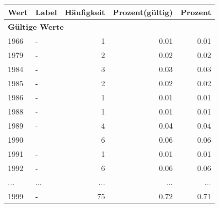      \begin{longtable}{lXrrr}
     \toprule
     \textbf{Wert} & \textbf{Label} & \textbf{Häufigkeit} & \textbf{Prozent(gültig)} & \textbf{Prozent} \\
     \endhead
     \midrule
     \multicolumn{5}{l}{\textbf{Gültige Werte}}\\
        1966 & \multicolumn{1}{X}{-} & %
          \num{1} &
          \num[round-mode=places,round-precision=2]{0,01} &
          \num[round-mode=places,round-precision=2]{0,01} \\
        1979 & \multicolumn{1}{X}{-} & %
          \num{2} &
          \num[round-mode=places,round-precision=2]{0,02} &
          \num[round-mode=places,round-precision=2]{0,02} \\
        1984 & \multicolumn{1}{X}{-} & %
          \num{3} &
          \num[round-mode=places,round-precision=2]{0,03} &
          \num[round-mode=places,round-precision=2]{0,03} \\
        1985 & \multicolumn{1}{X}{-} & %
          \num{2} &
          \num[round-mode=places,round-precision=2]{0,02} &
          \num[round-mode=places,round-precision=2]{0,02} \\
        1986 & \multicolumn{1}{X}{-} & %
          \num{1} &
          \num[round-mode=places,round-precision=2]{0,01} &
          \num[round-mode=places,round-precision=2]{0,01} \\
        1988 & \multicolumn{1}{X}{-} & %
          \num{1} &
          \num[round-mode=places,round-precision=2]{0,01} &
          \num[round-mode=places,round-precision=2]{0,01} \\
        1989 & \multicolumn{1}{X}{-} & %
          \num{4} &
          \num[round-mode=places,round-precision=2]{0,04} &
          \num[round-mode=places,round-precision=2]{0,04} \\
        1990 & \multicolumn{1}{X}{-} & %
          \num{6} &
          \num[round-mode=places,round-precision=2]{0,06} &
          \num[round-mode=places,round-precision=2]{0,06} \\
        1991 & \multicolumn{1}{X}{-} & %
          \num{1} &
          \num[round-mode=places,round-precision=2]{0,01} &
          \num[round-mode=places,round-precision=2]{0,01} \\
        1992 & \multicolumn{1}{X}{-} & %
          \num{6} &
          \num[round-mode=places,round-precision=2]{0,06} &
          \num[round-mode=places,round-precision=2]{0,06} \\
       ... & ... & ... & ... & ... \\
        1999 & \multicolumn{1}{X}{-} & %
          \num{75} &
          \num[round-mode=places,round-precision=2]{0,72} &
          \num[round-mode=places,round-precision=2]{0,71} \\


\end{longtable}
